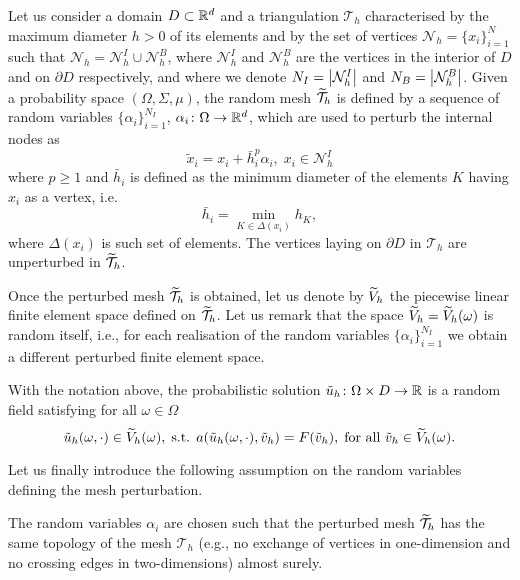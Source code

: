 \documentclass[10pt]{article}
\begin{document}
\begin{definition} \label{def:RandomMesh} Let us consider a domain $D \subset \mathbb{R}^d$ and a triangulation $\mathcal T_h$ characterised by the maximum diameter $h > 0$ of its elements and by the set of vertices $\mathcal N_h = \{x_i\}_{i=1}^{N}$ such that $\mathcal N_h = \mathcal N_h^I \cup \mathcal N_h^B$, where $\mathcal N_h^I$ and $\mathcal N_h^B$ are the vertices in the interior of $D$ and on $\partial D$ respectively, and where we denote $N_I = \left\lvert\mathcal N_h^I\right\rvert$ and $N_B = \left\lvert\mathcal N_h^B\right\rvert$. Given a probability space $(\Omega, \Sigma, \mu)$, the random mesh $\widetilde {\mathcal T}_h$ is defined by a sequence of random variables $\{\alpha_i\}_{i=1}^{N_I}$, $\alpha_i \colon \Omega \to \mathbb{R}^d$, which are used to perturb the internal nodes as
	\begin{equation}
	\tilde x_i = x_i + \bar h_i^p \alpha_i, \; x_i \in \mathcal N_h^I
	\end{equation}
	where $p \geq 1$ and $\bar h_i$ is defined as the minimum diameter of the elements $K$ having $x_i$ as a vertex, i.e.
	\begin{equation}
	\bar h_i = \min_{K \in \Delta(x_i)} h_K,
	\end{equation}
	where $\Delta(x_i)$ is such set of elements. The vertices laying on $\partial D$ in $\mathcal T_h$ are unperturbed in $\widetilde {\mathcal T}_h$.
\end{definition}

Once the perturbed mesh $\widetilde {\mathcal T}_h$ is obtained, let us denote by $\widetilde V_h$ the piecewise linear finite element space defined on $\widetilde {\mathcal T}_h$. Let us remark that the space $\widetilde V_h = \widetilde V_h(\omega)$ is random itself, i.e., for each realisation of the random variables $\{\alpha_i\}_{i=1}^{N_I}$ we obtain a different perturbed finite element space.


\begin{definition} \label{def:ProbSolution} With the notation above, the probabilistic solution $\tilde u_h \colon \Omega \times D \to \mathbb{R}$ is a random field satisfying for all $\omega \in \Omega$
	\begin{equation}
		\tilde u_h(\omega, \cdot) \in \widetilde V_h(\omega), \; \text{s.t. } a(\tilde u_h(\omega, \cdot), \tilde v_h) = F(\tilde v_h), \; \text{for all } \tilde v_h \in \widetilde V_h(\omega). 
	\end{equation}
\end{definition}

Let us finally introduce the following assumption on the random variables defining the mesh perturbation. 
\begin{assumption} \label{as:MeshPerturbation}  The random variables $\alpha_i$ are chosen such that the perturbed mesh $\widetilde {\mathcal T}_h$ has the same topology of the mesh $\mathcal T_h$ (e.g., no exchange of vertices in one-dimension and no crossing edges in two-dimensions) almost surely.  
\end{assumption}
\end{document}
